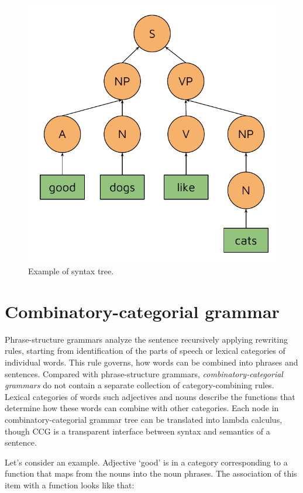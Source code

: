 \begin{figure}
\centering
\includegraphics{Figures/syntaxtree}
\decoRule
\caption[Syntax tree]{Example of syntax tree.}
\label{fig:syntax_tree}
\end{figure}

\section{Combinatory-categorial grammar}
Phrase-structure grammars analyze the sentence recursively applying rewriting rules, starting from identification of the parts of speech or lexical categories of individual words. This rule governs, how words can be combined into phrases and sentences. Compared with phrase-structure grammars, \emph{combinatory-categorial grammars} do not contain a separate collection of category-combining rules. Lexical categories of words such adjectives and nouns describe the functions that determine how these words can combine with other categories. Each node in combinatory-categorial grammar tree can be translated into lambda calculus, though CCG is a transparent interface between syntax and semantics of a sentence. 

Let's consider an example. Adjective ‘good’ is in a category corresponding to a function that maps from the nouns into the noun phrases. The association of this item with a function looks like that:

